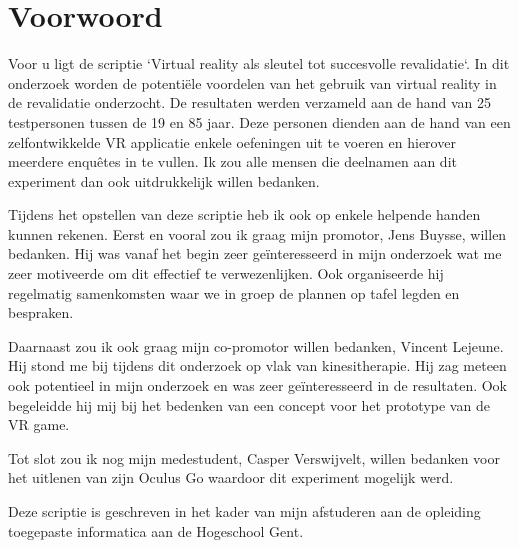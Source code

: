 
\chapter*{Voorwoord}
\label{ch:voorwoord}


Voor u ligt de scriptie `Virtual reality als sleutel tot succesvolle revalidatie`. In dit onderzoek worden de potentiële voordelen van het gebruik van virtual reality in de revalidatie onderzocht. De resultaten werden verzameld aan de hand van 25 testpersonen tussen de 19 en 85 jaar. Deze personen dienden aan de hand van een zelfontwikkelde VR applicatie enkele oefeningen uit te voeren en hierover meerdere enquêtes in te vullen. Ik zou alle mensen die deelnamen aan dit experiment dan ook uitdrukkelijk willen bedanken.

Tijdens het opstellen van deze scriptie heb ik ook op enkele helpende handen kunnen rekenen. Eerst en vooral zou ik graag mijn promotor, Jens Buysse, willen bedanken. Hij was vanaf het begin zeer geïnteresseerd in mijn onderzoek wat me zeer motiveerde om dit effectief te verwezenlijken. Ook organiseerde hij regelmatig samenkomsten waar we in groep de plannen op tafel legden en bespraken.

Daarnaast zou ik ook graag mijn co-promotor willen bedanken, Vincent Lejeune. Hij stond me bij tijdens dit onderzoek op vlak van kinesitherapie. Hij zag meteen ook potentieel in mijn onderzoek en was zeer geïnteresseerd in de resultaten. Ook begeleidde hij mij bij het bedenken van een concept voor het prototype van de VR game.

Tot slot zou ik nog mijn medestudent, Casper Verswijvelt, willen bedanken voor het uitlenen van zijn Oculus Go waardoor dit experiment mogelijk werd.

 Deze scriptie is geschreven in het kader van mijn afstuderen aan de opleiding toegepaste informatica aan de Hogeschool Gent.